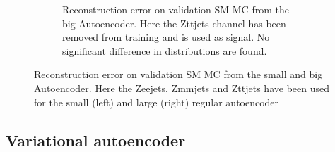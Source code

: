 \begin{figure}[H]
\begin{subfigure}{.45\textwidth}
        \caption{Reconstruction error on validation SM MC from the big Autoencoder. Here the Zttjets channel has been removed from training and 
        is used as signal. No significant difference in distributions are found. }
        \label{fig:ae_big_Zttjets}
    \end{subfigure}
    \hfill  
    \caption[AE | Channel removal, Zeejets, Zmmjets, Zttjets]{Reconstruction error on validation SM MC from the small and big Autoencoder. 
    Here the Zeejets, Zmmjets and Zttjets have been used for the small (left) and large (right) regular autoencoder}
    \label{fig:ae_big_channel5}
\end{figure}

\subsection*{Variational autoencoder}

